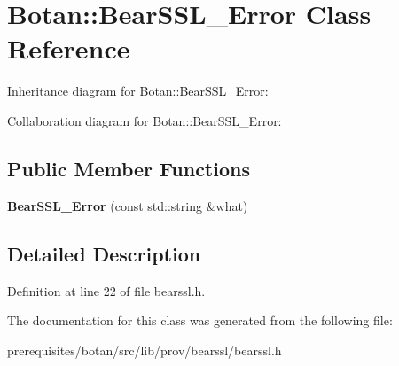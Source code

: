 \hypertarget{class_botan_1_1_bear_s_s_l___error}{}\section{Botan\+:\+:Bear\+S\+S\+L\+\_\+\+Error Class Reference}
\label{class_botan_1_1_bear_s_s_l___error}


Inheritance diagram for Botan\+:\+:Bear\+S\+S\+L\+\_\+\+Error\+:


Collaboration diagram for Botan\+:\+:Bear\+S\+S\+L\+\_\+\+Error\+:
\subsection*{Public Member Functions}
\begin{DoxyCompactItemize}
\item 
\mbox{\label{class_botan_1_1_bear_s_s_l___error_a6893e54f94f4a4376ad508fbfa5636aa}} 
{\bfseries Bear\+S\+S\+L\+\_\+\+Error} (const std\+::string \&what)
\end{DoxyCompactItemize}


\subsection{Detailed Description}


Definition at line 22 of file bearssl.\+h.



The documentation for this class was generated from the following file\+:\begin{DoxyCompactItemize}
\item 
prerequisites/botan/src/lib/prov/bearssl/bearssl.\+h\end{DoxyCompactItemize}
